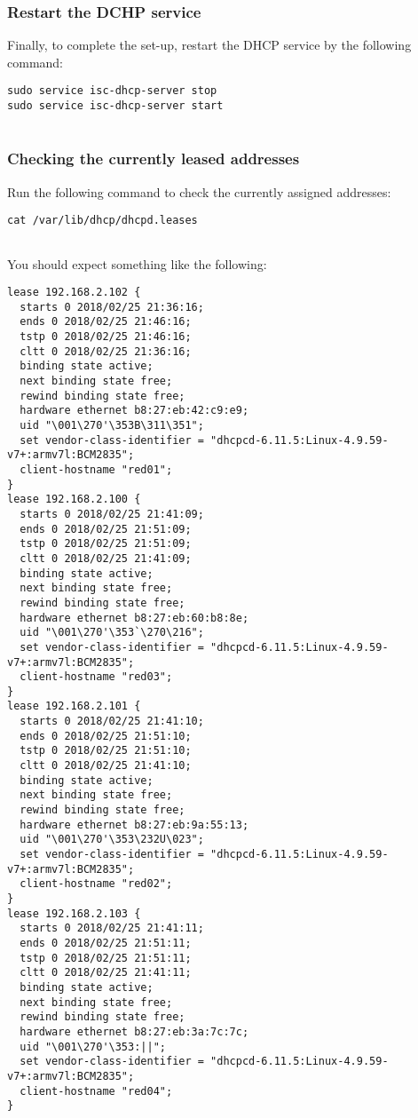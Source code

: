 \subsubsection{Restart the DCHP service}

Finally, to complete the set-up, restart the DHCP service by the
following command:

\begin{lstlisting}
sudo service isc-dhcp-server stop
sudo service isc-dhcp-server start
    
\end{lstlisting}

\subsubsection{Checking the currently leased addresses}

Run the following command to check the currently assigned addresses:

\begin{lstlisting}
cat /var/lib/dhcp/dhcpd.leases
    
\end{lstlisting}

You should expect something like the following:

\begin{lstlisting}
lease 192.168.2.102 {
  starts 0 2018/02/25 21:36:16;
  ends 0 2018/02/25 21:46:16;
  tstp 0 2018/02/25 21:46:16;
  cltt 0 2018/02/25 21:36:16;
  binding state active;
  next binding state free;
  rewind binding state free;
  hardware ethernet b8:27:eb:42:c9:e9;
  uid "\001\270'\353B\311\351";
  set vendor-class-identifier = "dhcpcd-6.11.5:Linux-4.9.59-v7+:armv7l:BCM2835";
  client-hostname "red01";
}
lease 192.168.2.100 {
  starts 0 2018/02/25 21:41:09;
  ends 0 2018/02/25 21:51:09;
  tstp 0 2018/02/25 21:51:09;
  cltt 0 2018/02/25 21:41:09;
  binding state active;
  next binding state free;
  rewind binding state free;
  hardware ethernet b8:27:eb:60:b8:8e;
  uid "\001\270'\353`\270\216";
  set vendor-class-identifier = "dhcpcd-6.11.5:Linux-4.9.59-v7+:armv7l:BCM2835";
  client-hostname "red03";
}
lease 192.168.2.101 {
  starts 0 2018/02/25 21:41:10;
  ends 0 2018/02/25 21:51:10;
  tstp 0 2018/02/25 21:51:10;
  cltt 0 2018/02/25 21:41:10;
  binding state active;
  next binding state free;
  rewind binding state free;
  hardware ethernet b8:27:eb:9a:55:13;
  uid "\001\270'\353\232U\023";
  set vendor-class-identifier = "dhcpcd-6.11.5:Linux-4.9.59-v7+:armv7l:BCM2835";
  client-hostname "red02";
}
lease 192.168.2.103 {
  starts 0 2018/02/25 21:41:11;
  ends 0 2018/02/25 21:51:11;
  tstp 0 2018/02/25 21:51:11;
  cltt 0 2018/02/25 21:41:11;
  binding state active;
  next binding state free;
  rewind binding state free;
  hardware ethernet b8:27:eb:3a:7c:7c;
  uid "\001\270'\353:||";
  set vendor-class-identifier = "dhcpcd-6.11.5:Linux-4.9.59-v7+:armv7l:BCM2835";
  client-hostname "red04";
}
\end{lstlisting}

